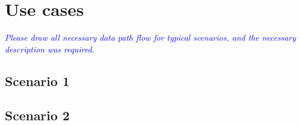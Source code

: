 
\clearpage

\section{Use cases}
\noindent\textit{\textcolor{blue}{Please draw all necessary data path flow for typical scenarios, and the necessary description was required.}}

\subsection{Scenario 1}
\subsection{Scenario 2}
